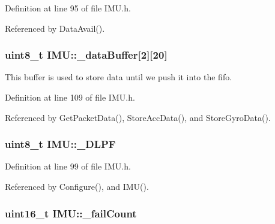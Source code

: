 Definition at line 95 of file IMU.h.



Referenced by DataAvail().

\hypertarget{class_i_m_u_ab87a54288295d4d10d605cf6c21d4d0f}{
\subsubsection[{\_\-dataBuffer}]{\setlength{\rightskip}{0pt plus 5cm}uint8\_\-t {\bf IMU::\_\-dataBuffer}\mbox{[}2\mbox{]}\mbox{[}20\mbox{]}}}
\label{class_i_m_u_ab87a54288295d4d10d605cf6c21d4d0f}


This buffer is used to store data until we push it into the fifo. 



Definition at line 109 of file IMU.h.



Referenced by GetPacketData(), StoreAccData(), and StoreGyroData().

\hypertarget{class_i_m_u_a3f9e6159234449cde8f5e72da8acf751}{
\subsubsection[{\_\-DLPF}]{\setlength{\rightskip}{0pt plus 5cm}uint8\_\-t {\bf IMU::\_\-DLPF}}}
\label{class_i_m_u_a3f9e6159234449cde8f5e72da8acf751}


Definition at line 99 of file IMU.h.



Referenced by Configure(), and IMU().

\hypertarget{class_i_m_u_a1e646aa38b84721fc650ef5d3388cc14}{
\subsubsection[{\_\-failCount}]{\setlength{\rightskip}{0pt plus 5cm}uint16\_\-t {\bf IMU::\_\-failCount}}}
\label{class_i_m_u_a1e646aa38b84721fc650ef5d3388cc14}


